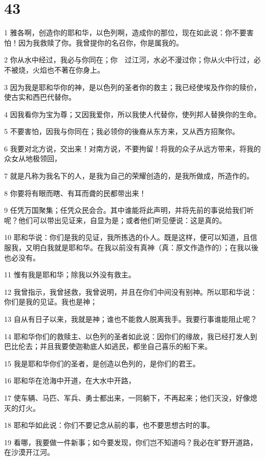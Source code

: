 \chapter{43}

\par 1 雅各啊，创造你的耶和华，以色列啊，造成你的那位，现在如此说：你不要害怕！因为我救赎了你。我曾提你的名召你，你是属我的。
\par 2 你从水中经过，我必与你同在；你　过江河，水必不漫过你；你从火中行过，必不被烧，火焰也不著在你身上。
\par 3 因为我是耶和华你的神，是以色列的圣者你的救主；我已经使埃及作你的赎价，使古实和西巴代替你。
\par 4 因我看你为宝为尊；又因我爱你，所以我使人代替你，使列邦人替换你的生命。
\par 5 不要害怕，因我与你同在；我必领你的後裔从东方来，又从西方招聚你。
\par 6 我要对北方说，交出来！对南方说，不要拘留！将我的众子从远方带来，将我的众女从地极领回，
\par 7 就是凡称为我名下的人，是我为自己的荣耀创造的，是我所做成，所造作的。
\par 8 你要将有眼而瞎、有耳而聋的民都带出来！
\par 9 任凭万国聚集；任凭众民会合。其中谁能将此声明，并将先前的事说给我们听呢？他们可以带出见证来，自显为是；或者他们听见便说：这是真的。
\par 10 耶和华说：你们是我的见证，我所拣选的仆人。既是这样，便可以知道，且信服我，又明白我就是耶和华。在我以前没有真神（真：原文作造作的）；在我以後也必没有。
\par 11 惟有我是耶和华；除我以外没有救主。
\par 12 我曾指示，我曾拯救，我曾说明，并且在你们中间没有别神。所以耶和华说：你们是我的见证。我也是神；
\par 13 自从有日子以来，我就是神；谁也不能救人脱离我手。我要行事谁能阻止呢？
\par 14 耶和华你们的救赎主、以色列的圣者如此说：因你们的缘故，我已经打发人到巴比伦去；并且我要使迦勒底人如逃民，都坐自己喜乐的船下来。
\par 15 我是耶和华你们的圣者，是创造以色列的，是你们的君王。
\par 16 耶和华在沧海中开道，在大水中开路，
\par 17 使车辆、马匹、军兵、勇士都出来，一同躺下，不再起来；他们灭没，好像熄灭的灯火。
\par 18 耶和华如此说：你们不要记念从前的事，也不要思想古时的事。
\par 19 看哪，我要做一件新事；如今要发现，你们岂不知道吗？我必在旷野开道路，在沙漠开江河。
